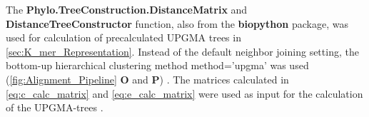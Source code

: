 The \textbf{Phylo.TreeConstruction.DistanceMatrix} and \textbf{DistanceTreeConstructor} function, also from the \textbf{biopython} package, was used for calculation of precalculated UPGMA trees in \autoref{sec:K_mer_Representation}. Instead of the default neighbor joining setting, the bottom-up hierarchical clustering method \colorbox{backcolour}{method='upgma'} was used (\autoref{fig:Alignment_Pipeline} \textsf{\textbf{O}} and \textsf{\textbf{P}}) \autocite{gower_minimum_1969, cock_biopython_2009}. The matrices calculated in \autoref{eq:c_calc_matrix} and \autoref{eq:e_calc_matrix} were used as input for the calculation of the UPGMA-trees \autocite{sokal_statistical_1958}.


    
        

    
        
